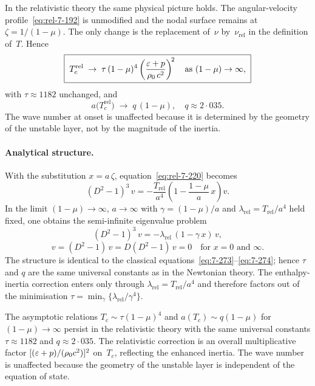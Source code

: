 In the relativistic theory the same physical picture holds.  The
angular-velocity profile~\eqref{eq:rel-7-192} is unmodified and the
nodal surface remains at $\zeta = 1/(1-\mu)$.  The only change is
the replacement of~$\nu$ by~$\nu_{\mathrm{rel}}$ in the definition
of~$T$.  Hence
\begin{equation}
\label{eq:rel-7-267}
\boxed{\;
T_{c}^{\mathrm{rel}}
  \;\to\; \tau\,(1-\mu)^{4}
    \left(\frac{\varepsilon+p}{\rho_0\,c^{2}}\right)^{\!2}
  \quad\text{as } (1-\mu) \to \infty,
\;}
\end{equation}
with $\tau \approx 1182$ unchanged, and
\begin{equation}
\label{eq:rel-7-268}
a\bigl(T_{c}^{\mathrm{rel}}\bigr)
  \;\to\; q\,(1-\mu),
  \quad q \approx 2{\cdot}035.
\end{equation}
The wave number at onset is unaffected because it is determined by
the geometry of the unstable layer, not by the magnitude of the
inertia.

\paragraph{Analytical structure.}
With the substitution $x = a\,\zeta$,
equation~\eqref{eq:rel-7-220} becomes
\begin{equation}
\label{eq:rel-7-270}
(D^{2}-1)^{3}\,v
  = -\frac{T_{\mathrm{rel}}}{a^{4}}
    \!\left(1 - \frac{1-\mu}{a}\,x\right) v.
\end{equation}
In the limit $(1-\mu) \to \infty$, $a \to \infty$ with
$\gamma = (1-\mu)/a$ and
$\lambda_{\mathrm{rel}} = T_{\mathrm{rel}}/a^{4}$ held fixed, one
obtains the semi-infinite eigenvalue problem
\begin{equation}
\label{eq:rel-7-273}
(D^{2}-1)^{3}\,v = -\lambda_{\mathrm{rel}}\,(1-\gamma\,x)\,v,
\end{equation}
\begin{equation}
\label{eq:rel-7-274}
v = (D^{2}-1)\,v = D(D^{2}-1)\,v = 0
\quad\text{for } x = 0 \text{ and } \infty.
\end{equation}
The structure is identical to the classical
equations~\eqref{eq:7-273}--\eqref{eq:7-274}; hence $\tau$ and $q$
are the same universal constants as in the Newtonian theory.  The
enthalpy-inertia correction enters only through
$\lambda_{\mathrm{rel}} = T_{\mathrm{rel}}/a^{4}$ and therefore
factors out of the minimisation
$\tau = \min_{\gamma}\{\lambda_{\mathrm{rel}}/\gamma^{4}\}$.

\begin{relcorrection}
The asymptotic relations
$T_{c} \sim \tau(1-\mu)^{4}$ and
$a(T_{c}) \sim q(1-\mu)$ for $(1-\mu) \to \infty$ persist in
the relativistic theory with the same universal constants
$\tau \approx 1182$ and $q \approx 2{\cdot}035$.
The relativistic correction is an overall multiplicative factor
$[(\varepsilon+p)/(\rho_0 c^{2})]^{2}$ on~$T_{c}$, reflecting
the enhanced inertia.  The wave number is unaffected because the
geometry of the unstable layer is independent of the equation of
state.
\end{relcorrection}

